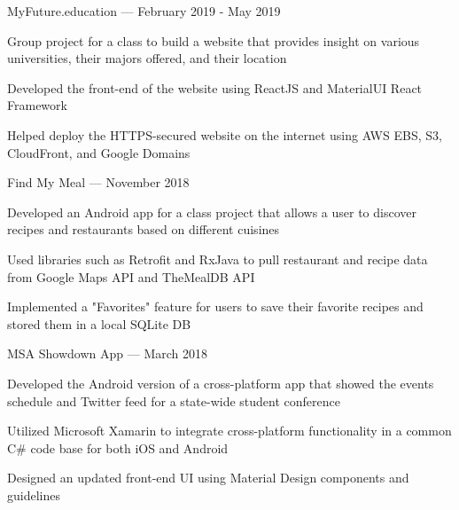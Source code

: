 


\begin{cventries}


\cventryalt
{MyFuture.education --- } %
{February 2019 - May 2019} %
{ %
\begin{cvitems}
\item {Group project for a class to build a website that provides insight on various universities, their majors offered, and their location}
\item {Developed the front-end of the website using ReactJS and MaterialUI React Framework}
\item {Helped deploy the HTTPS-secured website on the internet using AWS EBS, S3, CloudFront, and Google Domains}
\end{cvitems}
}


\cventryalt
{Find My Meal --- } %
{November 2018} %
{ %
\begin{cvitems}
\item {Developed an Android app for a class project that allows a user to discover recipes and restaurants based on different cuisines}
\item {Used libraries such as Retrofit and RxJava to pull restaurant and recipe data from Google Maps API and TheMealDB API}
\item {Implemented a "Favorites" feature for users to save their favorite recipes and stored them in a local SQLite DB}
\end{cvitems}
}


\cventryalt
{MSA Showdown App --- } %
{March 2018} %
{ %
\begin{cvitems}
\item {Developed the Android version of a cross-platform app that showed the events schedule and Twitter feed for a state-wide student conference}
\item {Utilized Microsoft Xamarin to integrate cross-platform functionality in a common C\# code base for both iOS and Android}
\item {Designed an updated front-end UI using Material Design components and guidelines}
\end{cvitems}
}


\end{cventries}
